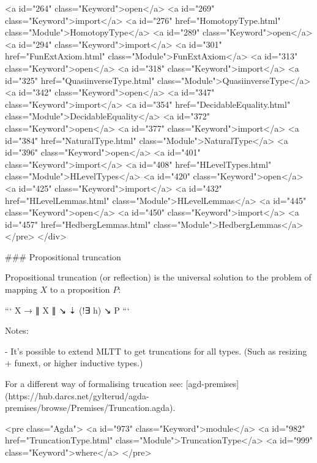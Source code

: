 <a id="264" class="Keyword">open</a> <a id="269" class="Keyword">import</a> <a id="276" href="HomotopyType.html" class="Module">HomotopyType</a>
<a id="289" class="Keyword">open</a> <a id="294" class="Keyword">import</a> <a id="301" href="FunExtAxiom.html" class="Module">FunExtAxiom</a>
<a id="313" class="Keyword">open</a> <a id="318" class="Keyword">import</a> <a id="325" href="QuasiinverseType.html" class="Module">QuasiinverseType</a>
<a id="342" class="Keyword">open</a> <a id="347" class="Keyword">import</a> <a id="354" href="DecidableEquality.html" class="Module">DecidableEquality</a>
<a id="372" class="Keyword">open</a> <a id="377" class="Keyword">import</a> <a id="384" href="NaturalType.html" class="Module">NaturalType</a>
<a id="396" class="Keyword">open</a> <a id="401" class="Keyword">import</a> <a id="408" href="HLevelTypes.html" class="Module">HLevelTypes</a>
<a id="420" class="Keyword">open</a> <a id="425" class="Keyword">import</a> <a id="432" href="HLevelLemmas.html" class="Module">HLevelLemmas</a>
<a id="445" class="Keyword">open</a> <a id="450" class="Keyword">import</a> <a id="457" href="HedbergLemmas.html" class="Module">HedbergLemmas</a>
</pre>
</div>

### Propositional truncation

Propositional truncation (or reflection) is the universal
solution to the problem of mapping $X$ to a proposition $P$:

```
X  → ∥ X ∥
 ↘    ⇣ (!∃ h)
    ↘ P
```

Notes:

 - It's possible to extend MLTT to get truncations for all types.
 (Such as resizing + funext, or higher inductive types.)

For a different way of formalising trucation see:
[agd-premises](https://hub.darcs.net/gylterud/agda-premises/browse/Premises/Truncation.agda).

<pre class="Agda">
<a id="973" class="Keyword">module</a>
  <a id="982" href="TruncationType.html" class="Module">TruncationType</a>
  <a id="999" class="Keyword">where</a>
</pre>

